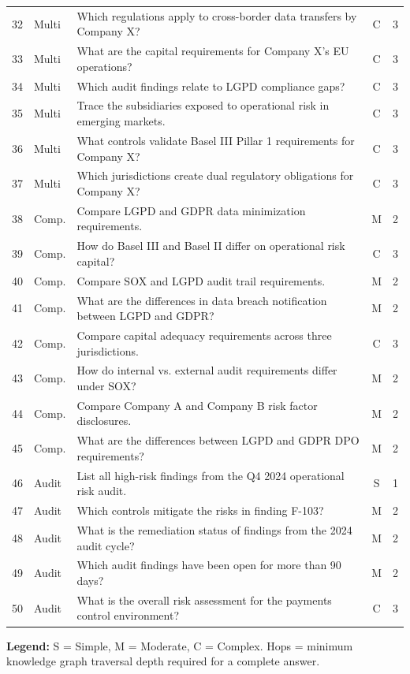 \documentclass[review]{elsarticle}
\begin{document}
\begin{longtable}{@{}clp{6cm}cc@{}}
32 & Multi & Which regulations apply to cross-border data transfers by Company X? & C & 3 \\
33 & Multi & What are the capital requirements for Company X's EU operations? & C & 3 \\
34 & Multi & Which audit findings relate to LGPD compliance gaps? & C & 3 \\
35 & Multi & Trace the subsidiaries exposed to operational risk in emerging markets. & C & 3 \\
36 & Multi & What controls validate Basel III Pillar 1 requirements for Company X? & C & 3 \\
37 & Multi & Which jurisdictions create dual regulatory obligations for Company X? & C & 3 \\
38 & Comp. & Compare LGPD and GDPR data minimization requirements. & M & 2 \\
39 & Comp. & How do Basel III and Basel II differ on operational risk capital? & C & 3 \\
40 & Comp. & Compare SOX and LGPD audit trail requirements. & M & 2 \\
41 & Comp. & What are the differences in data breach notification between LGPD and GDPR? & M & 2 \\
42 & Comp. & Compare capital adequacy requirements across three jurisdictions. & C & 3 \\
43 & Comp. & How do internal vs. external audit requirements differ under SOX? & M & 2 \\
44 & Comp. & Compare Company A and Company B risk factor disclosures. & M & 2 \\
45 & Comp. & What are the differences between LGPD and GDPR DPO requirements? & M & 2 \\
46 & Audit & List all high-risk findings from the Q4 2024 operational risk audit. & S & 1 \\
47 & Audit & Which controls mitigate the risks in finding F-103? & M & 2 \\
48 & Audit & What is the remediation status of findings from the 2024 audit cycle? & M & 2 \\
49 & Audit & Which audit findings have been open for more than 90 days? & M & 2 \\
50 & Audit & What is the overall risk assessment for the payments control environment? & C & 3 \\
\end{longtable}

\noindent\textbf{Legend:} S = Simple, M = Moderate, C = Complex. Hops = minimum knowledge graph traversal depth required for a complete answer.
\end{document}
